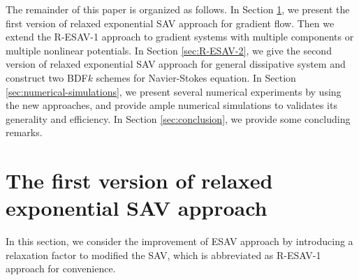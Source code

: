\documentclass[final,review,onefignum,onetabnum]{siamart190516}
\theoremstyle{plain}
\begin{document}
The remainder of this paper is organized as follows. 
In Section \ref{sec:R-ESAV-1}, we present the first version of relaxed exponential SAV approach for gradient flow. 
Then we extend the R-ESAV-1 approach to gradient systems with multiple components or multiple nonlinear potentials. 
In Section \ref{sec:R-ESAV-2}, we give the second version of relaxed exponential SAV approach for general dissipative system and construct two BDF$k$ schemes for Navier-Stokes equation. 
In Section \ref{sec:numerical-simulations}, we present several numerical experiments by using the new approaches, and provide ample numerical simulations to validates its generality and efficiency. 
In Section \ref{sec:conclusion}, we provide some concluding remarks.


 
 \section{The first version of relaxed exponential SAV approach}
 \label{sec:R-ESAV-1}
In this section, we consider the improvement of ESAV approach \cite{liu2020exponential} by introducing a relaxation factor to modified the SAV, which is abbreviated as R-ESAV-1 approach for convenience.


\end{document}
